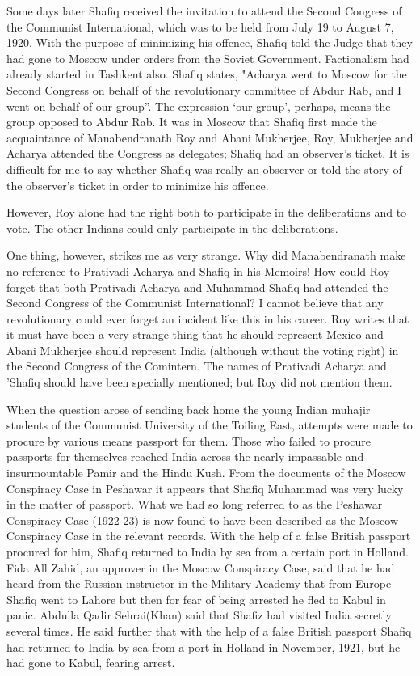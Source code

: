 Some days later Shafiq received the invitation to attend the Second Congress of the Communist International, which was to be held from July 19 to August 7, 1920, With the purpose of minimizing his offence, Shafiq told the Judge that they had gone to Moscow under orders from the Soviet Government. Factionalism had already started in Tashkent also. Shafiq states, "Acharya went to Moscow for the Second Congress on behalf of the revolutionary committee of Abdur Rab, and I went on behalf of our group”. The expression ‘our group’, perhaps, means the group opposed to Abdur Rab. It was in Moscow that Shafiq first made the acquaintance 
of Manabendranath Roy and Abani Mukherjee, Roy, Mukherjee and Acharya attended the Congress as delegates; Shafiq had an observer’s ticket. It is difficult for me to say whether Shafiq was really an observer or told the story of the observer’s ticket in order to minimize his offence. 

However, Roy alone had the right both to participate in the deliberations and to vote. The other Indians could only participate in the deliberations. 

One thing, however, strikes me as very strange. Why did Manabendranath make no reference to Prativadi Acharya and Shafiq in his Memoirs! How could Roy forget that both Prativadi Acharya and Muhammad Shafiq had attended the Second Congress of the Communist International? I cannot believe that any revolutionary could ever forget an incident like this in his career. Roy writes that it must have been a very strange thing that he should represent Mexico and Abani Mukherjee should represent India (although without the voting right) in the Second Congress of the Comintern. The names of Prativadi Acharya and 'Shafiq should have been specially mentioned; but Roy did not mention them. 

When the question arose of sending back home the young Indian muhajir students of the Communist University of the Toiling East, attempts were made to procure by various means passport for them. Those who failed to procure passports for themselves reached India across the nearly impassable and insurmountable Pamir and the Hindu Kush. From the documents of the Moscow Conspiracy Case in Peshawar it appears that Shafiq Muhammad was very lucky in the matter of passport. What we had so long referred to as the Peshawar Conspiracy Case (1922-23) is now found to have been described as the Moscow Conspiracy Case in the relevant records. With the help of a false British passport procured for him, Shafiq returned to India by sea from a certain port in Holland. Fida All Zahid, an approver in the Moscow Conspiracy Case, said that he had heard from the Russian instructor in the Military Academy that from Europe Shafiq went to Lahore but then for fear of being arrested he fled to Kabul in panic. Abdulla Qadir Sehrai(Khan) said that Shafiz had visited India secretly several times. He said further that with the help of a false British passport Shafiq had returned to India by sea from a port in Holland in November, 1921, but he had gone to Kabul, fearing arrest. 

